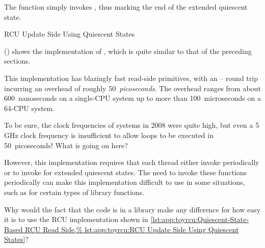The  function simply invokes
, thus marking the end of the extended
quiescent state.

\begin{listing}[tbp]

\caption{RCU Update Side Using Quiescent States}
\label{lst:app:toyrcu:RCU Update Side Using Quiescent States}
\end{listing}

()
shows the implementation of , which is
quite similar to that of the preceding sections.

This implementation has blazingly fast read-side primitives, with
an -- round trip incurring
an overhead of roughly 50~\emph{picoseconds}.
The  overhead ranges from about 600~nanoseconds
on a single-CPU  system up to more than 100~microseconds on
a 64-CPU system.

\QuickQuiz{}
	To be sure, the clock frequencies of \Power{}
	systems in 2008 were quite high, but even a 5\,GHz clock
	frequency is insufficient to allow
	loops to be executed in 50~picoseconds!
	What is going on here?
 \QuickQuizEnd

However, this implementation requires that each thread either
invoke  periodically or to invoke
 for extended quiescent states.
The need to invoke these functions periodically can make this
implementation difficult to use in some situations, such as for
certain types of library functions.

\QuickQuiz{}
	Why would the fact that the code is in a library make
	any difference for how easy it is to use the RCU
	implementation shown in
	\cref{lst:app:toyrcu:Quiescent-State-Based RCU Read Side,%
	lst:app:toyrcu:RCU Update Side Using Quiescent States}?
 \QuickQuizEnd

